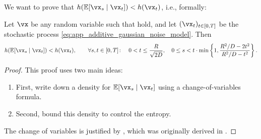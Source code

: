 \documentclass[../../book-main.tex]{subfiles}
\begin{document}
We want to prove that \(h(\Ex[\vx_{s} \mid \vx_{t}]) < h(\vx_{t})\), i.e., formally:
\begin{theorem}\label{thm:conditioning_reduces_entropy}
    Let \(\vx\) be any random variable such that  hold, and let \((\vx_{t})_{t \in [0, T]}\) be the stochastic process \eqref{eq:app_additive_gaussian_noise_model}. Then 
    \begin{equation}
        h(\Ex[\vx_{s} \mid \vx_{t}]) < h(\vx_{t}), \qquad \forall s, t \in [0, T] \colon \quad 0 < t \leq \frac{R}{\sqrt{2D}}, \quad 0 \leq s  < t\cdot\min\bc{1, \frac{R^{2}/D - 2t^{2}}{R^{2}/D - t^{2}}}.
    \end{equation}
\end{theorem}
\begin{proof}
    This proof uses two main ideas:
    \begin{enumerate}
        \item First, write down a density for \(\Ex[\vx_{s} \mid \vx_{t}]\) using a change-of-variables formula.
        \item Second, bound this density to control the entropy.
    \end{enumerate}
    The change of variables is justified by , which was originally derived in \cite{Gribonval2011-pf}.


\end{proof}
\end{document}
